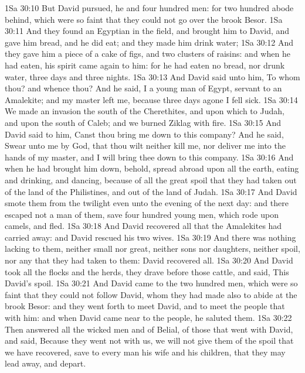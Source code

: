 \vs 1Sa 30:10 But David pursued, he and four hundred men: for two hundred abode behind, which were so faint that they could not go over the brook Besor.
\vs 1Sa 30:11 And they found an Egyptian in the field, and brought him to David, and gave him bread, and he did eat; and they made him drink water;
\vs 1Sa 30:12 And they gave him a piece of a cake of figs, and two clusters of raisins: and when he had eaten, his spirit came again to him: for he had eaten no bread, nor drunk  water, three days and three nights.
\vs 1Sa 30:13 And David said unto him, To whom  thou? and whence  thou? And he said, I  a young man of Egypt, servant to an Amalekite; and my master left me, because three days agone I fell sick.
\vs 1Sa 30:14 We made an invasion  the south of the Cherethites, and upon  which  to Judah, and upon the south of Caleb; and we burned Ziklag with fire.
\vs 1Sa 30:15 And David said to him, Canst thou bring me down to this company? And he said, Swear unto me by God, that thou wilt neither kill me, nor deliver me into the hands of my master, and I will bring thee down to this company.
\vs 1Sa 30:16 And when he had brought him down, behold,  spread abroad upon all the earth, eating and drinking, and dancing, because of all the great spoil that they had taken out of the land of the Philistines, and out of the land of Judah.
\vs 1Sa 30:17 And David smote them from the twilight even unto the evening of the next day: and there escaped not a man of them, save four hundred young men, which rode upon camels, and fled.
\vs 1Sa 30:18 And David recovered all that the Amalekites had carried away: and David rescued his two wives.
\vs 1Sa 30:19 And there was nothing lacking to them, neither small nor great, neither sons nor daughters, neither spoil, nor any  that they had taken to them: David recovered all.
\vs 1Sa 30:20 And David took all the flocks and the herds,  they drave before those  cattle, and said, This  David's spoil.
\vs 1Sa 30:21 And David came to the two hundred men, which were so faint that they could not follow David, whom they had made also to abide at the brook Besor: and they went forth to meet David, and to meet the people that  with him: and when David came near to the people, he saluted them.
\vs 1Sa 30:22 Then answered all the wicked men and  of Belial, of those that went with David, and said, Because they went not with us, we will not give them  of the spoil that we have recovered, save to every man his wife and his children, that they may lead  away, and depart.
